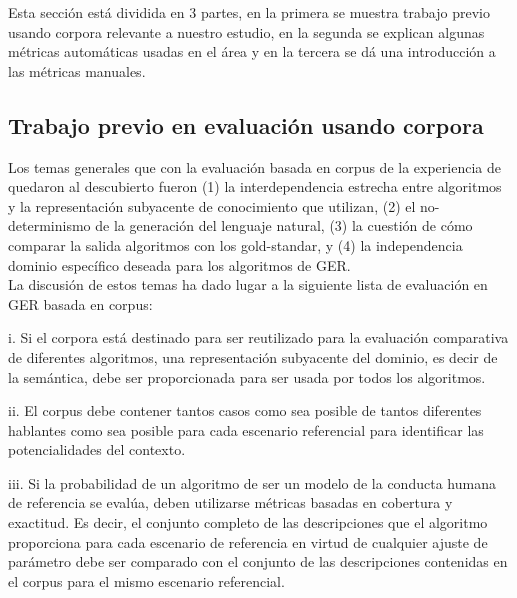 Esta secci\'on est\'a dividida en 3 partes, en la primera se muestra trabajo previo usando corpora relevante a nuestro estudio, en la segunda se explican algunas m\'etricas autom\'aticas usadas en el \'area y en la tercera se d\'a una introducci\'on a las m\'etricas manuales.

\subsection{Trabajo previo en evaluaci\'on usando corpora}\label{sec:2_3_1}

Los temas generales que con la evaluaci\'on basada en corpus de la experiencia de \cite{viet:gene11} quedaron
al descubierto fueron (1) la interdependencia estrecha entre algoritmos y la
representaci\'on subyacente de conocimiento que utilizan, (2) el no-determinismo de la generaci\'on del lenguaje natural, 
(3) la cuesti\'on de c\'omo comparar la salida algoritmos con los gold-standar, y (4) la independencia dominio espec\'ifico deseada para los algoritmos de GER.\\
La discusi\'on de estos temas ha dado lugar a la siguiente lista de evaluaci\'on en GER basada en corpus:

i. Si el corpora est\'a destinado para ser reutilizado para la evaluaci\'on comparativa de diferentes
algoritmos, una representaci\'on subyacente del dominio, es decir de la sem\'antica, debe ser proporcionada para ser usada por todos los algoritmos.

ii. El corpus debe contener tantos casos como sea posible de tantos diferentes hablantes como sea posible para cada escenario referencial para identificar las potencialidades del contexto. 

iii. Si la probabilidad de un algoritmo de ser un modelo de la conducta humana de referencia
se eval\'ua, deben utilizarse m\'etricas basadas en cobertura y exactitud. Es decir, el conjunto completo de las descripciones que el algoritmo proporciona para cada
escenario de referencia en virtud de cualquier ajuste de par\'ametro debe ser comparado con el
conjunto de las descripciones contenidas en el corpus para el mismo escenario referencial.

